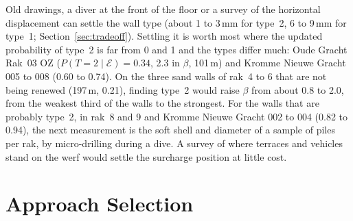 Old drawings, a diver at the front of the floor or a survey of the horizontal displacement can settle the wall type (about 1 to 3\,mm for type~2, 6 to 9\,mm
for type~1; Section~\ref{sec:tradeoff}). Settling it is worth most where the updated probability
of type~2 is far from 0 and 1 and the types differ much: Oude Gracht Rak~03 OZ
($P(T{=}2 \mid \mathcal{E}) = 0.34$, 2.3 in $\beta$, 101\,m) and Kromme Nieuwe Gracht 005
to 008 (0.60 to 0.74). On the three sand walls of rak~4 to 6 that are not
being renewed (197\,m, 0.21), finding type~2 would raise $\beta$ from about 0.8
to 2.0, from the weakest third of the walls to the strongest. For the walls that are probably
type~2, in rak~8 and 9 and Kromme Nieuwe Gracht 002 to 004 (0.82 to 0.94), the
next measurement is the soft shell and diameter of a sample of piles per rak,
by micro-drilling during a dive. A survey of where terraces and vehicles stand
on the werf would settle the surcharge position at little cost.

\clearpage
\section{Approach Selection}
\label{sec:approach-selection}



